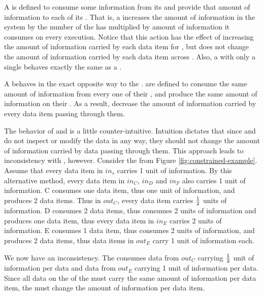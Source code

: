 A {\splitter} is defined to consume some information from its {\Input}
{{\Channel}} and provide that amount of information to each of its
{\Output} {{\Channels}}.  That is, a {\splitter} increases the amount of
information in the system by the number of {\Output} {{\Channels}} the
{\splitter} has multiplied by amount of information it consumes on
every execution. Notice that this action has the effect of
increasing the amount of information carried by each data item for
{\roundrobin} {\splitters}, but does not change the amount of
information carried by each data item across {\duplicate}
{\splitters}.  Also, a {\splitter} with only a single {\Output} {{\Channel}}
behaves exactly the same as a {\filter}.

A {\joiner} behaves in the exact opposite way to the {\splitter}.
{\joiners} are defined to consume the same amount of information
from every one of their {\Input} {{\Channels}}, and produce the same
amount of information on their {\Output} {{\Channel}}.  As a result,
{\joiners} decrease the amount of information carried by every data
item passing through them.

The behavior of {\splitters} and {\joiners} is a little
counter-intuitive.  Intuition dictates that since {\splitters} and
{\joiners} do not inspect or modify the data in any way, they should
not change the amount of information carried by data passing
through them.  This approach leads to inconsistency with
{\splitjoins}, however.  Consider the {\splitjoin} from Figure
\ref{fig:constrained-example}.  Assume that every data item in
{{\Channel}} $in_s$ carries 1 unit of information.  By this
alternative method, every data item in {{\Channels}} $in_C$, $in_D$
and $in_F$ also carries 1 unit of information.  {\filter} C consumes
one data item, thus one unit of information, and produces 2 data
items. Thus in {{\Channel}} $out_C$, every data item carries $1 \over
2$ units of information.  {\filter} D consumes 2 data items, thus
consumes 2 units of information and produces one data item, thus
every data item in {{\Channel}} $in_E$ carries 2 units of information.
{\filter} E consumes 1 data item, thus consumes 2 units of
information, and produces 2 data items, thus data items in
{{\Channel}} $out_E$ carry 1 unit of information each.

We now have an inconsistency.  The {\joiner} consumes data from
{{\Channel}} $out_C$ carrying $1 \over 2$ unit of information per data
and data from {{\Channel}} $out_E$ carrying 1 unit of information per
data. Since all data on the {\Output} {{\Channel}} of the {\joiner} must
carry the same amount of information per data item, the {\joiner}
must change the amount of information per data item.

